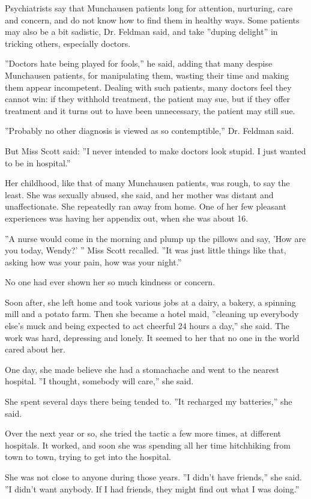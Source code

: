 Psychiatrists say that Munchausen patients long for attention,
nurturing, care and concern, and do not know how to find them in healthy
ways. Some patients may also be a bit sadistic, Dr. Feldman said, and
take ''duping delight'' in tricking others, especially doctors.

''Doctors hate being played for fools,'' he said, adding that many
despise Munchausen patients, for manipulating them, wasting their time
and making them appear incompetent. Dealing with such patients, many
doctors feel they cannot win: if they withhold treatment, the patient
may sue, but if they offer treatment and it turns out to have been
unnecessary, the patient may still sue.

''Probably no other diagnosis is viewed as so contemptible,'' Dr.
Feldman said.

But Miss Scott said: ''I never intended to make doctors look stupid. I
just wanted to be in hospital.''

Her childhood, like that of many Munchausen patients, was rough, to say
the least. She was sexually abused, she said, and her mother was distant
and unaffectionate. She repeatedly ran away from home. One of her few
pleasant experiences was having her appendix out, when she was about 16.

''A nurse would come in the morning and plump up the pillows and say,
'How are you today, Wendy?' '' Miss Scott recalled. ''It was just little
things like that, asking how was your pain, how was your night.''

No one had ever shown her so much kindness or concern.

Soon after, she left home and took various jobs at a dairy, a bakery, a
spinning mill and a potato farm. Then she became a hotel maid,
''cleaning up everybody else's muck and being expected to act cheerful
24 hours a day,'' she said. The work was hard, depressing and lonely. It
seemed to her that no one in the world cared about her.

One day, she made believe she had a stomachache and went to the nearest
hospital. ''I thought, somebody will care,'' she said.

She spent several days there being tended to. ''It recharged my
batteries,'' she said.

Over the next year or so, she tried the tactic a few more times, at
different hospitals. It worked, and soon she was spending all her time
hitchhiking from town to town, trying to get into the hospital.

She was not close to anyone during those years. ''I didn't have
friends,'' she said. ''I didn't want anybody. If I had friends, they
might find out what I was doing.''

